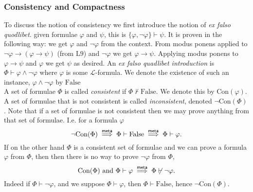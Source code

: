 \subsubsection{Consistency and Compactness}
To discuss the notion of consistency we first introduce the notion of \emph{ex falso quodlibet}. given formulae $\varphi$ and $\psi$, this is $\{\varphi,\neg \varphi\}\vdash \psi$. It is proven in the following way: we get $\varphi$ and $\neg \varphi$ from the context. From modus ponens applied to $\neg\varphi \to (\varphi \to \psi)$ (from $\mathrm{L}9$) and $\neg \varphi$ we get $\varphi\to \psi$. Applying modus ponens to $\varphi\to \psi$ and $\varphi$ we get $\psi$ as desired. An \emph{ex falso quadlibet introduction} is $\Phi\vdash \varphi\wedge \neg\varphi$ where $\varphi$ is some $\mathcal{L}$-formula. We denote the existence of such an instance, $\varphi\wedge \neg\varphi$ by $\mathrm{False}$ \\
A set of formulae $\Phi$ is called \emph{consistent} if $\Phi\not\vdash \mathrm{False}$. We denote this by $\mathrm{Con}(\varphi)$. A set of formulae that is not consistent is called \emph{inconsistent}, denoted $\neg\mathrm{Con}(\Phi)$. Note that if a set of formulae is not consistent then we may prove anything from that set of formulae. I.e. for a formula $\varphi$ 
$$\neg\mathrm{Con}(\Phi)\mathrel{\overset{\mathsf{meta}}{\implies}} \Phi \vdash \mathrm{False} \mathrel{\overset{\mathsf{meta}}{\implies}} \Phi \vdash \varphi.$$
If on the other hand $\Phi$ is a consistent set of formulae and we can prove a formula $\varphi$ from $\Phi$, then then there is no way to prove $\neg\varphi$ from $\Phi$,
$$\mathrm{Con}(\Phi) \text{ and } \Phi\vdash \varphi\mathrel{\overset{\mathsf{meta}}{\implies}} \Phi\not\vdash \neg\varphi.$$
Indeed if $\Phi\vdash \neg\varphi$, and we suppose $\Phi\vdash \varphi$, then $\Phi\vdash \mathrm{False}$, hence $\neg\mathrm{Con}(\Phi)$.\\

